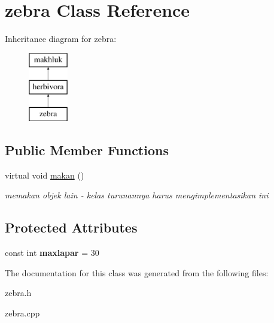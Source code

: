 \hypertarget{classzebra}{}\section{zebra Class Reference}
\label{classzebra}
Inheritance diagram for zebra\+:\begin{figure}[H]
\begin{center}
\leavevmode
\includegraphics[height=3.000000cm]{classzebra}
\end{center}
\end{figure}
\subsection*{Public Member Functions}
\begin{DoxyCompactItemize}
\item 
virtual void \hyperlink{classzebra_ab9083f6b8691e987cde895d07d67da63}{makan} ()\hypertarget{classzebra_ab9083f6b8691e987cde895d07d67da63}{}\label{classzebra_ab9083f6b8691e987cde895d07d67da63}

\begin{DoxyCompactList}\small\item\em memakan objek lain -\/ kelas turunannya harus mengimplementasikan ini \end{DoxyCompactList}\end{DoxyCompactItemize}
\subsection*{Protected Attributes}
\begin{DoxyCompactItemize}
\item 
const int {\bfseries maxlapar} = 30\hypertarget{classzebra_aeca9f79d6791d93fc6e2faef9e52433d}{}\label{classzebra_aeca9f79d6791d93fc6e2faef9e52433d}

\end{DoxyCompactItemize}


The documentation for this class was generated from the following files\+:\begin{DoxyCompactItemize}
\item 
zebra.\+h\item 
zebra.\+cpp\end{DoxyCompactItemize}
